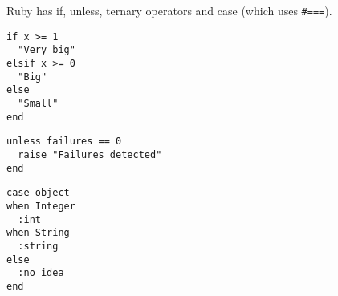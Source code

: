 Ruby has if, unless, ternary operators and case (which uses \texttt{#===}).

\begin{multicols}{3}
\begin{verbatim}
if x >= 1
  "Very big"
elsif x >= 0
  "Big"
else
  "Small"
end
\end{verbatim}
\columnbreak

\begin{verbatim}
unless failures == 0
  raise "Failures detected"
end
\end{verbatim}
\columnbreak

\begin{verbatim}
case object
when Integer
  :int
when String
  :string
else
  :no_idea
end
\end{verbatim}
\end{multicols}